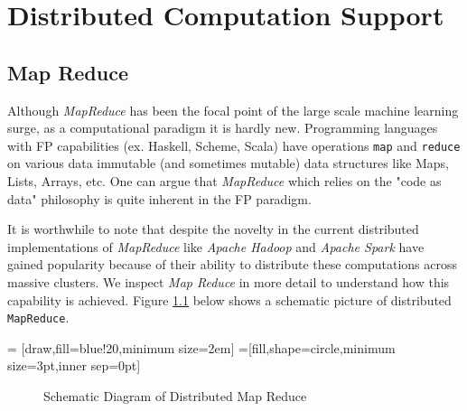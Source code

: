 \chapter{Distributed Computation Support}
\label{cha:3}

\section{Map Reduce}

Although \textit{MapReduce} \cite{MapReduce} has been the focal point of the large scale machine learning surge, as a computational paradigm it is hardly new. Programming languages with FP capabilities (ex. Haskell, Scheme, Scala) have operations \texttt{map} and \texttt{reduce} on various data immutable (and sometimes mutable) data structures like Maps, Lists, Arrays, etc. One can argue that \textit{MapReduce} which relies on the "code as data" philosophy is quite inherent in the FP paradigm.

It is worthwhile to note that despite the novelty in the current distributed implementations of \textit{MapReduce} like \textit{Apache Hadoop} \cite{Hadoop:2005} and \textit{Apache Spark} have gained popularity because of their ability to distribute these computations across massive clusters. We inspect \textit{Map Reduce} in more detail to understand how this capability is achieved. Figure \ref{fig:mapreduce} below shows a schematic picture of distributed \texttt{MapReduce}.

 = [draw,fill=blue!20,minimum size=2em]
\def\radius{.7mm} 
=[fill,shape=circle,minimum size=3pt,inner sep=0pt]
\begin{figure}[!ht] 
\begin{adjustbox}{max width=\textwidth}
\end{adjustbox}
\caption{Schematic Diagram of Distributed Map Reduce}
\label{fig:mapreduce}
\end{figure}


